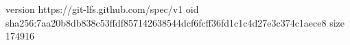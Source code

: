 version https://git-lfs.github.com/spec/v1
oid sha256:7aa20b8db838c53ffdf857142638544dcf6fcff36fd1c1c4d27e3c374c1aece8
size 174916
